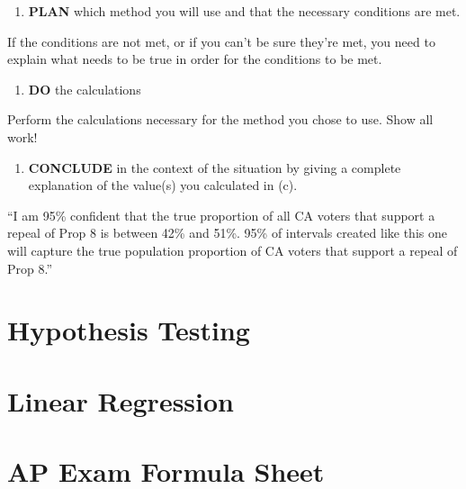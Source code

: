 \documentclass[
]{book}
\providecommand{\tightlist}{%
  \setlength{\itemsep}{0pt}\setlength{\parskip}{0pt}}
\begin{document}
\begin{enumerate}
\def\labelenumi{\arabic{enumi}.}
\setcounter{enumi}{1}
\tightlist
\item
  \textbf{PLAN} which method you will use and that the necessary conditions are met.
\end{enumerate}

If the conditions are not met, or if you can't be sure they're met, you need to explain what needs to be true in order for the conditions to be met.

\begin{enumerate}
\def\labelenumi{\arabic{enumi}.}
\setcounter{enumi}{2}
\tightlist
\item
  \textbf{DO} the calculations
\end{enumerate}

Perform the calculations necessary for the method you chose to use. Show all work!

\begin{enumerate}
\def\labelenumi{\arabic{enumi}.}
\setcounter{enumi}{3}
\tightlist
\item
  \textbf{CONCLUDE} in the context of the situation by giving a complete explanation of the value(s) you calculated in (c).
\end{enumerate}

``I am 95\% confident that the true proportion of all CA voters that support a repeal of Prop 8 is between 42\% and 51\%. 95\% of intervals created like this one will capture the true population proportion of CA voters that support a repeal of Prop 8.''

\hypertarget{hypothesis-testing}{%
\chapter{Hypothesis Testing}\label{hypothesis-testing}}

\hypertarget{linear-regression}{%
\chapter{Linear Regression}\label{linear-regression}}

\hypertarget{appendix-appendix}{%
\appendix}


\hypertarget{ap-exam-formula-sheet}{%
\chapter{AP Exam Formula Sheet}\label{ap-exam-formula-sheet}}
\end{document}

